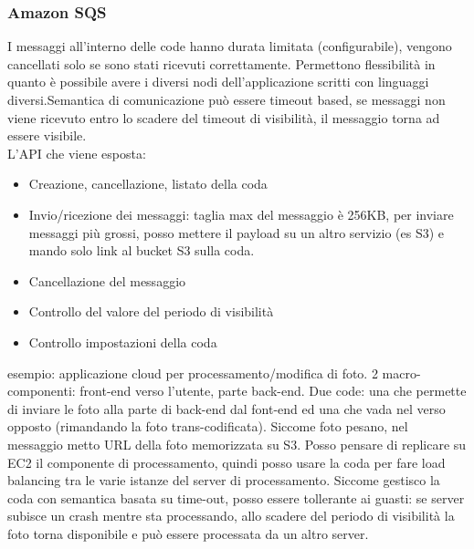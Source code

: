 \documentclass[16px]{article}
\begin{document}
\subsubsection{Amazon SQS}
I messaggi all'interno delle code hanno durata limitata (configurabile), vengono cancellati solo se sono stati ricevuti correttamente. Permettono flessibilità in quanto è possibile avere i diversi nodi dell'applicazione scritti con linguaggi diversi.Semantica di comunicazione può essere timeout based, se messaggi non viene ricevuto entro lo scadere del timeout di visibilità, il messaggio torna ad essere visibile.\\ L'API che viene esposta:
\begin{itemize}
\item Creazione, cancellazione, listato della coda
\item Invio/ricezione dei messaggi: taglia max del messaggio è 256KB, per inviare messaggi più grossi, posso mettere il payload su un altro servizio (es S3) e mando solo link al bucket S3 sulla coda.
\item Cancellazione del messaggio
\item Controllo del valore del periodo di visibilità
\item Controllo impostazioni della coda
\end{itemize}
esempio: applicazione cloud per processamento/modifica di foto. 2 macro-componenti: front-end verso l'utente, parte back-end. Due code: una che permette di inviare le foto alla parte di back-end dal font-end ed una che vada nel verso opposto (rimandando la foto trans-codificata). Siccome foto pesano, nel messaggio metto URL della foto memorizzata su S3. Posso pensare di replicare su EC2 il componente di processamento, quindi posso usare la coda per fare load balancing tra le varie istanze del server di processamento. Siccome gestisco la coda con semantica basata su time-out, posso essere tollerante ai guasti: se server subisce un crash mentre sta processando, allo scadere del periodo di visibilità la foto torna disponibile e può essere processata da un altro server.
\end{document}
